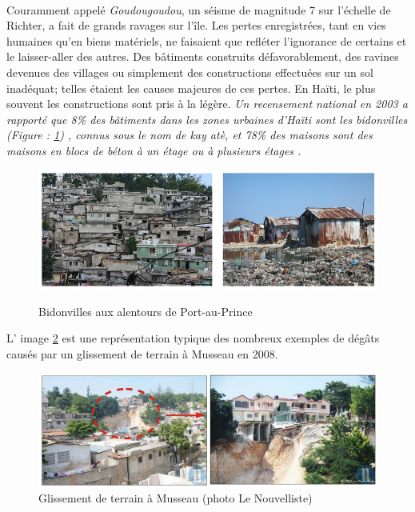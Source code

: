 \paragraph{}
Couramment appelé \textit{Goudougoudou}, un séisme de magnitude 7\cite{mondiale2010haiti} sur l'échelle de Richter, 
a fait de grands ravages sur l'île. Les pertes enregistrées, tant en vies humaines qu'en biens
matériels, ne faisaient que refléter l'ignorance de certains et le laisser-aller des autres. 
Des bâtiments construits défavorablement, des ravines devenues des villages ou simplement des 
constructions effectuées sur un sol inadéquat; telles étaient les causes majeures de ces 
pertes. En Haïti, le plus souvent les constructions sont pris à la légère.
\textit{
    Un recensement national en 2003 a rapporté que 8\% des bâtiments dans les zones urbaines d'Haïti sont
    les bidonvilles (Figure : \ref{fig:bidonville})    
    , connus sous le nom de kay atè, et 78\% des maisons sont 
    des maisons en blocs 
    de béton à un étage ou à plusieurs étages \cite{desroches2011overview}.} 
    \begin{figure}
        \centering
        \includegraphics[width=1\textwidth]{images/Contexte/bidonville.png}
        \caption{Bidonvilles aux alentours de Port-au-Prince  }\cite{holly1999problemes}
        \label{fig:bidonville}
    \end{figure}
L' image \ref{fig:musseau} est une représentation typique
 des nombreux exemples de dégâts causés par un glissement de terrain à Musseau en 2008.
 \begin{figure}
    \centering
    \includegraphics[width=1\textwidth]{images/Contexte/musseau.png}
    \caption{Glissement de terrain à Musseau (photo Le Nouvelliste)}
    \label{fig:musseau}
\end{figure}
